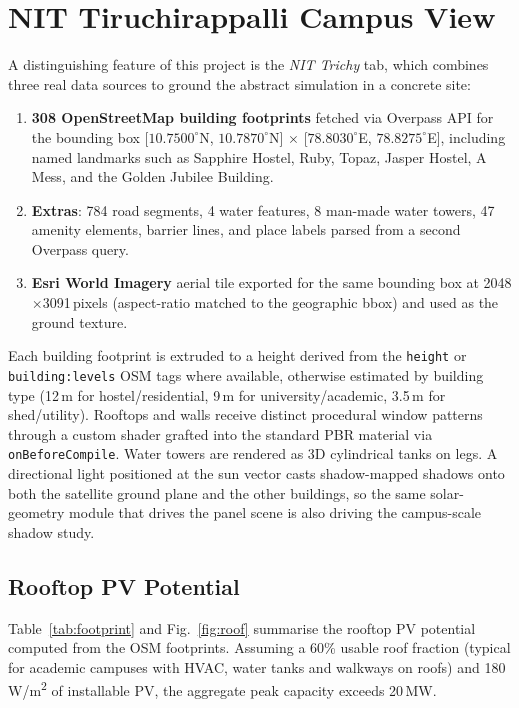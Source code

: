 \documentclass[conference]{IEEEtran}
\begin{document}
\section{NIT Tiruchirappalli Campus View}
A distinguishing feature of this project is the \emph{NIT Trichy} tab, which combines three real data sources to ground the abstract simulation in a concrete site:

\begin{enumerate}
\item \textbf{308 OpenStreetMap building footprints} fetched via Overpass API for the bounding box [$10.7500^{\circ}$N, $10.7870^{\circ}$N] $\times$ [$78.8030^{\circ}$E, $78.8275^{\circ}$E], including named landmarks such as Sapphire Hostel, Ruby, Topaz, Jasper Hostel, A Mess, and the Golden Jubilee Building.
\item \textbf{Extras}: 784 road segments, 4 water features, 8 man-made water towers, 47 amenity elements, barrier lines, and place labels parsed from a second Overpass query.
\item \textbf{Esri World Imagery} aerial tile exported for the same bounding box at 2048$\times$3091\,pixels (aspect-ratio matched to the geographic bbox) and used as the ground texture.
\end{enumerate}

Each building footprint is extruded to a height derived from the \texttt{height} or \texttt{building:levels} OSM tags where available, otherwise estimated by building type (12\,m for hostel/residential, 9\,m for university/academic, 3.5\,m for shed/utility). Rooftops and walls receive distinct procedural window patterns through a custom shader grafted into the standard PBR material via \texttt{onBeforeCompile}. Water towers are rendered as 3D cylindrical tanks on legs. A directional light positioned at the sun vector casts shadow-mapped shadows onto both the satellite ground plane and the other buildings, so the same solar-geometry module that drives the panel scene is also driving the campus-scale shadow study.

\subsection{Rooftop PV Potential}
Table~\ref{tab:footprint} and Fig.~\ref{fig:roof} summarise the rooftop PV potential computed from the OSM footprints. Assuming a 60\% usable roof fraction (typical for academic campuses with HVAC, water tanks and walkways on roofs) and 180\,W/m\textsuperscript{2} of installable PV, the aggregate peak capacity exceeds 20\,MW.
\end{document}
